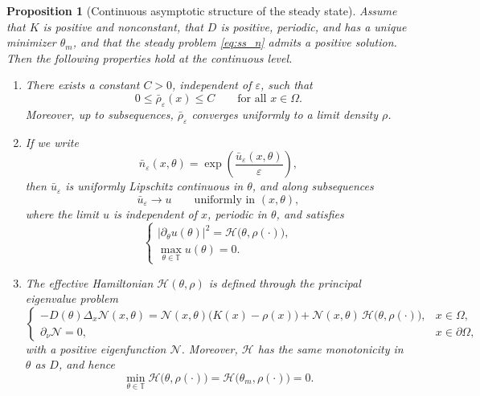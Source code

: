 \documentclass[11pt, dina4, amsfont12]{article}
\newtheorem{proposition}{Proposition}[section]
\begin{document}
\begin{proposition}[Continuous asymptotic structure of the steady state]\label{prop:continuous_structure}
Assume that \(K\) is positive and nonconstant, that \(D\) is positive, periodic, and has a unique minimizer \(\theta_m\), and that the steady problem \eqref{eq:ss_n} admits a positive solution. Then the following properties hold at the continuous level.
\begin{enumerate}
\item There exists a constant \(C>0\), independent of \(\varepsilon\), such that
\begin{equation}\label{eq:rho_continuous_bound}
0\le \bar\rho_\varepsilon(x)\le C
\qquad \text{for all } x\in\Omega.
\end{equation}
Moreover, up to subsequences, \(\bar\rho_\varepsilon\) converges uniformly to a limit density \(\rho\).

\item If we write
\begin{equation}\label{eq:u_log_transform}
\bar n_\varepsilon(x,\theta)=\exp\!\left(\frac{\bar u_\varepsilon(x,\theta)}{\varepsilon}\right),
\end{equation}
then \(\bar u_\varepsilon\) is uniformly Lipschitz continuous in \(\theta\), and along subsequences
\begin{equation}\label{eq:u_limit_uniform}
\bar u_\varepsilon \to u
\qquad \text{uniformly in } (x,\theta),
\end{equation}
where the limit \(u\) is independent of \(x\), periodic in \(\theta\), and satisfies
\begin{equation}\label{eq:HJ_limit}
\begin{cases}
|\partial_\theta u(\theta)|^2 = \mathcal H\bigl(\theta,\rho(\cdot)\bigr),\\[1mm]
\displaystyle \max_{\theta\in\mathbb T} u(\theta)=0.
\end{cases}
\end{equation}

\item The effective Hamiltonian \(\mathcal H(\theta,\rho)\) is defined through the principal eigenvalue problem
\begin{equation}\label{eq:eigen_N}
\begin{cases}
-D(\theta)\Delta_x \mathcal N(x,\theta)
= \mathcal N(x,\theta)\bigl(K(x)-\rho(x)\bigr)
+ \mathcal N(x,\theta)\,\mathcal H\bigl(\theta,\rho(\cdot)\bigr), & x\in\Omega,\\
\partial_\nu \mathcal N = 0, & x\in\partial\Omega,
\end{cases}
\end{equation}
with a positive eigenfunction \(\mathcal N\). Moreover, \(\mathcal H\) has the same monotonicity in \(\theta\) as \(D\), and hence
\begin{equation}\label{eq:H_min_zero}
\min_{\theta\in\mathbb T} \mathcal H\bigl(\theta,\rho(\cdot)\bigr)
=
\mathcal H\bigl(\theta_m,\rho(\cdot)\bigr)
=0.
\end{equation}


\end{enumerate}
\end{proposition}
\end{document}
